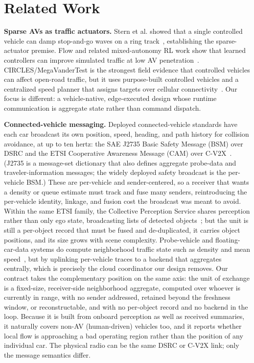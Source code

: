 \section{Related Work}
\label{sec:related}

\noindent\textbf{Sparse AVs as traffic actuators.}
Stern et al. showed that a single controlled vehicle can damp stop-and-go waves on a ring track~\cite{stern2018dissipation}, establishing the sparse-actuator premise. Flow and related mixed-autonomy RL work show that learned controllers can improve simulated traffic at low AV penetration~\cite{wu2017flow,vinitsky2018benchmarks,kreidieh2018dissipating}. CIRCLES/MegaVanderTest is the strongest field evidence that controlled vehicles can affect open-road traffic, but it uses purpose-built controlled vehicles and a centralized speed planner that assigns targets over cellular connectivity~\cite{lee2024traffic}. Our focus is different: a vehicle-native, edge-executed design whose runtime communication is aggregate state rather than command dispatch.

\noindent\textbf{Connected-vehicle messaging.}
Deployed connected-vehicle standards have each car broadcast its own position, speed, heading, and path history for collision avoidance, at up to ten hertz: the SAE J2735 Basic Safety Message (BSM) over DSRC and the ETSI Cooperative Awareness Message (CAM) over C-V2X~\cite{sae2020j2735,etsi2019cam,kenney2011dedicated}. (J2735 is a message-set dictionary that also defines aggregate probe-data and traveler-information messages; the widely deployed safety broadcast is the per-vehicle BSM.) These are per-vehicle and sender-centered, so a receiver that wants a density or queue estimate must track and fuse many senders, reintroducing the per-vehicle identity, linkage, and fusion cost the broadcast was meant to avoid. Within the same ETSI family, the Collective Perception Service shares perception rather than only ego state, broadcasting lists of detected objects~\cite{etsi2023cpm}; but the unit is still a per-object record that must be fused and de-duplicated, it carries object positions, and its size grows with scene complexity. Probe-vehicle and floating-car-data systems do compute neighborhood traffic state such as density and mean speed~\cite{seo2017traffic,herrera2010evaluation}, but by uplinking per-vehicle traces to a backend that aggregates centrally, which is precisely the cloud coordinator our design removes. Our contract takes the complementary position on the same axis: the unit of exchange is a fixed-size, receiver-side neighborhood aggregate, computed over whoever is currently in range, with no sender addressed, retained beyond the freshness window, or reconstructable, and with no per-object record and no backend in the loop. Because it is built from onboard perception as well as received summaries, it naturally covers non-AV (human-driven) vehicles too, and it reports whether local flow is approaching a bad operating region rather than the position of any individual car. The physical radio can be the same DSRC or C-V2X link; only the message semantics differ.


